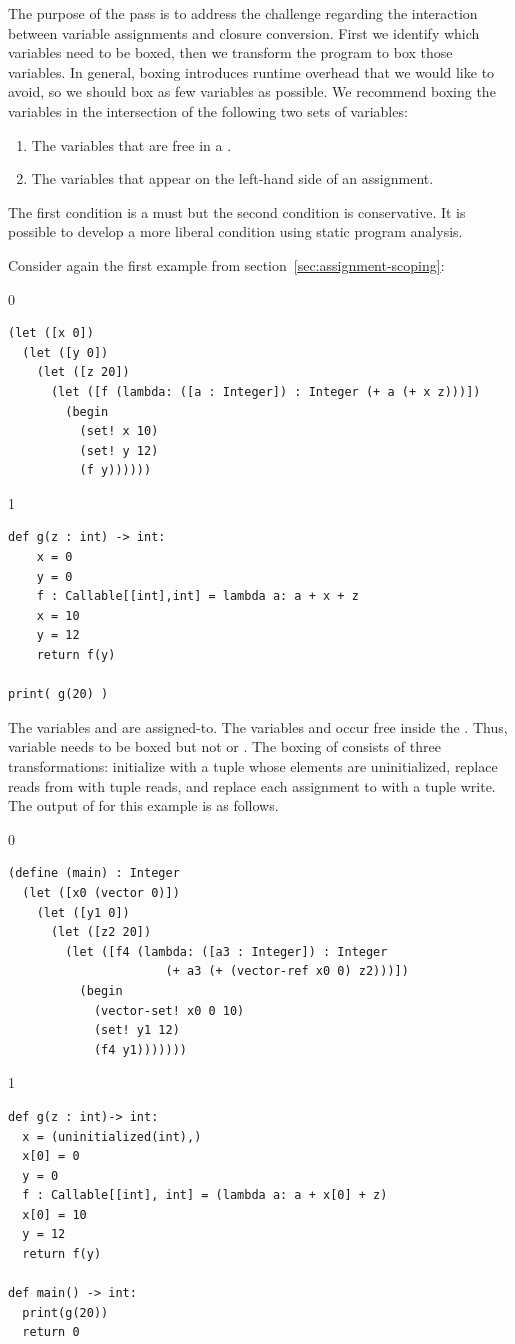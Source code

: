 \documentclass[7x10]{TimesAPriori_MIT}%
\def\racketEd{0}
\def\pythonEd{1}
\def\edition{0}
\numberwithin{theorem}{chapter}
\numberwithin{definition}{chapter}
\numberwithin{equation}{chapter}
\begin{document}
The purpose of the  pass is to address the
challenge regarding the interaction between variable assignments and
closure conversion.  First we identify which variables need to be
boxed, then we transform the program to box those variables. In
general, boxing introduces runtime overhead that we would like to
avoid, so we should box as few variables as possible. We recommend
boxing the variables in the intersection of the following two sets of
variables:
\begin{enumerate}
\item The variables that are free in a .
\item The variables that appear on the left-hand side of an
  assignment.
\end{enumerate}
The first condition is a must but the second condition is
conservative. It is possible to develop a more liberal condition using
static program analysis.

Consider again the first example from
section~\ref{sec:assignment-scoping}:
%
{\if\edition\racketEd
\begin{lstlisting}
(let ([x 0])
  (let ([y 0])
    (let ([z 20])
      (let ([f (lambda: ([a : Integer]) : Integer (+ a (+ x z)))])
        (begin
          (set! x 10)
          (set! y 12)
          (f y))))))
\end{lstlisting}
\fi}
{\if\edition\pythonEd
\begin{lstlisting}
def g(z : int) -> int:
    x = 0
    y = 0  
    f : Callable[[int],int] = lambda a: a + x + z
    x = 10
    y = 12
    return f(y)

print( g(20) )
\end{lstlisting}
\fi}
%
\noindent The variables  and  are assigned-to.  The
variables  and  occur free inside the
. Thus, variable  needs to be boxed but not
 or .  The boxing of  consists of three
transformations: initialize  with a tuple whose elements are uninitialized,
replace reads from  with tuple reads, and replace each assignment to 
with a tuple write. The output of  for
this example is as follows.
%
{\if\edition\racketEd
\begin{lstlisting}
(define (main) : Integer
  (let ([x0 (vector 0)])
    (let ([y1 0])
      (let ([z2 20])
        (let ([f4 (lambda: ([a3 : Integer]) : Integer
                      (+ a3 (+ (vector-ref x0 0) z2)))])
          (begin 
            (vector-set! x0 0 10)
            (set! y1 12)
            (f4 y1)))))))
\end{lstlisting}
\fi}
%
{\if\edition\pythonEd
\begin{lstlisting}
def g(z : int)-> int:
  x = (uninitialized(int),)
  x[0] = 0
  y = 0
  f : Callable[[int], int] = (lambda a: a + x[0] + z)
  x[0] = 10
  y = 12
  return f(y)

def main() -> int:
  print(g(20))
  return 0
\end{lstlisting}
\fi}
\end{document}
